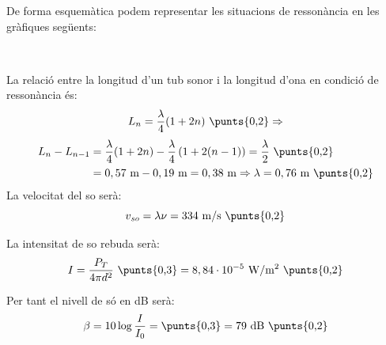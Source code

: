 \begin{solapartat}
De forma esquemàtica podem representar les situacions de ressonància en les gràfiques següents:

\noindent\begin{minipage}[b]{0.45\linewidth}
\end{minipage}\ 

La relació entre la longitud d'un tub sonor i la longitud d'ona en condició de ressonància és:
\[ L_n = \frac{\lambda}{4}(1 + 2n)\ \text{\punts{0,2}} \Rightarrow \]
\begin{align*}
L_n - L_{n-1} &= \frac{\lambda}{4}(1+2n) - \frac{\lambda}{4}\,(1 + 2(n-1)) = \frac{\lambda}{2}\ \text{\punts{0,2}}\\
&= 0,57\ \mathrm{m} - 0,19\ \mathrm{m} = 0,38\ \mathrm{m} \Rightarrow \lambda = 0,76\ \mathrm{m}\ \text{\punts{0,2}}
\end{align*}
La velocitat del so serà:
\[ v_\textit{so} = \lambda\nu = 334\ \mathrm{m/s}\ \text{\punts{0,2}} \]
\end{solapartat}

\begin{solapartat}
La intensitat de so rebuda serà:
\[ I = \frac{P_T}{4\pi d^2}\ \text{\punts{0,3}} = 8,84\cdot 10^{-5}\ \mathrm{W/m^2}\ \text{\punts{0,2}} \]

Per tant el nivell de só en dB serà:
\[ \beta = 10\log\frac{I}{I_0} = \text{\punts{0,3}} = 79\ \mathrm{dB}\ \text{\punts{0,2}} \]
\end{solapartat}
